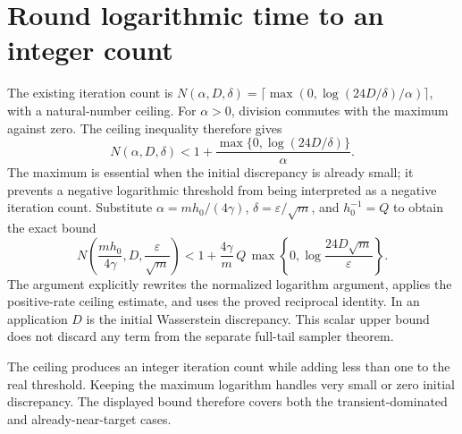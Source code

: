 \documentclass[11pt,a4paper]{article}
\begin{document}
\section{\texorpdfstring{Round logarithmic time to an integer count}{Round logarithmic time to an integer count}}


The existing iteration count is \(N(\alpha,D,\delta)=\lceil\max(0,\log(24D/\delta)/\alpha)\rceil\), with a natural-number ceiling. For \(\alpha>0\), division commutes with the maximum against zero. The ceiling inequality therefore gives \[N(\alpha,D,\delta)<1+\frac{\max\{0,\log(24D/\delta)\}}{\alpha}.\] The maximum is essential when the initial discrepancy is already small; it prevents a negative logarithmic threshold from being interpreted as a negative iteration count. Substitute \(\alpha=mh_0/(4\gamma)\), \(\delta=\varepsilon/\sqrt m\), and \(h_0^{-1}=Q\) to obtain the exact bound \[N\!\left(\frac{mh_0}{4\gamma},D,\frac{\varepsilon}{\sqrt m}\right)<1+\frac{4\gamma}{m}\,Q\,\max\!\left\{0,\log\frac{24D\sqrt m}{\varepsilon}\right\}.\] The argument explicitly rewrites the normalized logarithm argument, applies the positive-rate ceiling estimate, and uses the proved reciprocal identity. In an application \(D\) is the initial Wasserstein discrepancy. This scalar upper bound does not discard any term from the separate full-tail sampler theorem.



The ceiling produces an integer iteration count while adding less than one to the real threshold. Keeping the maximum logarithm handles very small or zero initial discrepancy. The displayed bound therefore covers both the transient-dominated and already-near-target cases.
\end{document}
